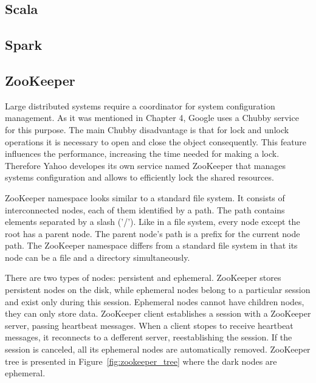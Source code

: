 

\subsection{Scala}


\subsection{Spark}

\subsection{ZooKeeper}
Large distributed systems require a coordinator for system configuration management.
As it was mentioned in Chapter 4, Google uses a Chubby service for this purpose.
The main Chubby disadvantage is that for lock and unlock operations it is necessary to open and close the object consequently.
This feature influences the performance, increasing the time needed for making a lock.
Therefore Yahoo developes its own service named ZooKeeper that manages systems configuration and allows to efficiently lock the shared resources.

ZooKeeper namespace looks similar to a standard file system.
It consists of interconnected nodes, each of them identified by a path.
The path contains elements separated by a slash ('/').
Like in a file system, every node except the root has a parent node.
The parent node's path is a prefix for the current node path.
The ZooKeeper namespace differs from a standard file system in that its node can be a file and a directory simultaneously.

There are two types of nodes: persistent and ephemeral.
ZooKeeper stores persistent nodes on the disk, while ephemeral nodes belong to a particular session and exist only during this session.
Ephemeral nodes cannot have children nodes, they can only store data.
ZooKeeper client establishes a session with a ZooKeeper server, passing heartbeat messages.
When a client stopes to receive heartbeat messages, it reconnects to a defferent server, reestablishing the session.
If the session is canceled, all its ephemeral nodes are automatically removed.
ZooKeeper tree is presented in Figure~\ref{fig:zookeeper_tree} where the dark nodes are ephemeral.

